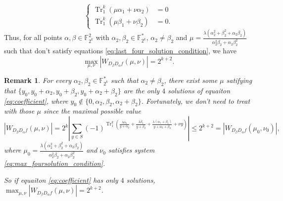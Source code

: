 \documentclass{article}
\newcommand{\F}{\mathbb{F}}
\newcommand{\TRACE}{\operatorname{Tr}_1^k}
\newtheorem{remark}{Remark}
\theoremstyle{nonumberplain}
\newcommand{\0}{\textbf{0}}
\newcommand{\1}{\textbf{1}}
\begin{document}
        \begin{equation}\label{eq:max_foursolution_condition}\left\{
        \begin{alignedat}{2}
            \TRACE\left(\mu\alpha_1+\nu\alpha_2\right)&=0\\
            \TRACE\left(\mu\beta_1+\nu\beta_2\right)&=0.
        \end{alignedat}\right.
\end{equation}
    Thus, for all points $ \alpha,\beta\in\F_{2^k}^2 $ with $ \alpha_2,\beta_2\in\F_{2^k}^* $, $ \alpha_2\ne\beta_2 $ 
    and $ \mu=\frac{\lambda(\alpha_2^2+\beta_2^2+\alpha_2\beta_2)}{\alpha_2^2\beta_2+\alpha_2\beta_2^2} $ 
    such that don't satisfy equations \eqref{eq:last_four_solution_condition}, we have 
    \[\max_{\mu,\nu}|W_{D_{\beta}D_{\alpha}f}(\mu,\nu)|=2^{k+2}.\]
    
    
    \begin{remark}
        For every $ \alpha_2,\beta_2\in\F_{2^k}^* $ such that $ \alpha_2\ne\beta_2 $, there exist some $ \mu $ 
        satifying that $ \{y_0,y_0+\alpha_2,y_0+\beta_2,y_0+\alpha_2+\beta_2\} $ are the only $ 4 $ solutions of 
        equaiton \eqref{eq:coefficient}, where $ y_0\notin\{0, \alpha_2, \beta_2, \alpha_2+\beta_2\} $. Fortunately, 
        we don't need to treat with those $ \mu $ 
        since the maximal possible value 
        \[ |W_{D_{\beta}D_{\alpha}f}(\mu,\nu)|=2^k\left\lvert\sum_{y\in S}(-1)^{\TRACE\left(\frac{\lambda\alpha_1}{y+\alpha_2}+\frac{\lambda\beta_1}{y+\beta_2}+\frac{\lambda(\alpha_1+\beta_1)}{y+\alpha_2+\beta_2}+\nu y\right)}\right\rvert\le 2^{k+2}=|W_{D_{\beta}D_{\alpha}f}(\mu_0,\nu_0)|, \]   
        where $ \mu_0=\frac{\lambda(\alpha_2^2+\beta_2^2+\alpha_2\beta_2)}{\alpha_2^2\beta_2+\alpha_2\beta_2^2} $ 
        and $ \nu_0 $ satisfies system \eqref{eq:max_foursolution_condition}. 

        
        
        So if equaiton \eqref{eq:coefficient} has only $ 4 $ solutions, 
        $ \max_{\mu,\nu}|W_{D_{\beta}D_{\alpha}f}(\mu,\nu)|=2^{k+2} $.
        
    \end{remark}
    
\end{document}
